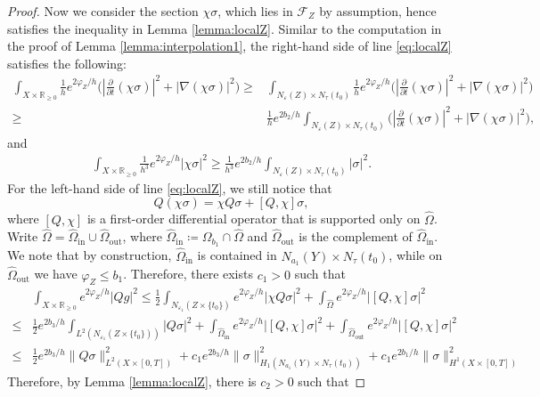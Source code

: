\documentclass[12pt, reqno]{amsart}
\theoremstyle{plain}%
\theoremstyle{definition}
\theoremstyle{remark}
\numberwithin{equation}{section}
\newcommand{\R}{\mathbb{R}}
\begin{document}
\begin{proof}
	Now we consider the section $\chi\sigma$, which lies in $\mathcal F_Z$ by assumption, hence satisfies the inequality in Lemma \ref{lemma:localZ}. Similar to the computation in the proof of Lemma \ref{lemma:interpolation1}, the right-hand side of line \eqref{eq:localZ} satisfies the following:
	\begin{align*}
	\int_{X\times\R_{\geq 0}}\frac 1 he^{2\varphi_Z/h}\Big(|\frac{\partial}{\partial t} (\chi\sigma)|^2+|\nabla (\chi\sigma)|^2\Big)\geq&\int_{N_\varepsilon(Z)\times N_\tau(t_0)}\frac 1 he^{2\varphi_Z/h}\Big(|\frac{\partial}{\partial t} (\chi\sigma)|^2+|\nabla (\chi\sigma)|^2\Big)\\
	\geq &\frac 1 he^{2b_2/h}\int_{N_\varepsilon(Z)\times N_\tau(t_0)}\Big(|\frac{\partial}{\partial t} (\chi\sigma)|^2+|\nabla (\chi\sigma)|^2\Big),
	\end{align*}
	and
	\begin{align*}
		\int_{X\times\R_{\geq 0}}\frac{1}{h^3}e^{2\varphi_Z/h}|\chi\sigma|^2\geq \frac{1}{h^3}e^{2b_2/h}\int_{N_\varepsilon(Z)\times N_\tau(t_0)}|\sigma|^2.
	\end{align*}	
	For the left-hand side of line \eqref{eq:localZ}, we still notice that 
	$$Q(\chi\sigma)=\chi Q\sigma+[Q,\chi]\sigma,$$
	where $[Q,\chi]$ is a first-order differential operator that is supported only on $\widehat\Omega$. Write $\widehat\Omega=\widehat\Omega_{\text{in}}\cup \widehat\Omega_{\text{out}}$, where $\widehat\Omega_{\text{in}}\coloneqq \Omega_{b_1}\cap\widehat\Omega$ and $\widehat\Omega_{\text{out}}$ is the complement of $\widehat\Omega_{\text{in}}$. We note that by construction, $\widehat\Omega_{\text{in}}$ is contained in $N_{a_1}(Y)\times N_\tau(t_0)$, while on  $\widehat\Omega_{\text{out}}$ we have $\varphi_Z\leq b_1$. Therefore, there exists $c_1>0$ such that
	\begin{align*}
		&\int_{X\times\R_{\geq 0}}e^{2\varphi_Z/h}|Qg|^2\leq \frac 1 2\int_{N_{\varepsilon_1}(Z\times\{t_0\})}e^{2\varphi_Z/h}|\chi Q\sigma|^2+\int_{\widehat\Omega}e^{2\varphi_Z/h}|[Q,\chi]\sigma|^2\\
	\leq &\frac1 2e^{2b_3/h}\int_{L^2(N_{\varepsilon_1}(Z\times\{t_0\}))}|Q\sigma|^2+\int_{\widehat\Omega_{\text{in}}}e^{2\varphi_Z/h}|[Q,\chi]\sigma|^2+\int_{\widehat\Omega_{\text{out}}}e^{2\varphi_Z/h}|[Q,\chi]\sigma|^2\\
	\leq &\frac1 2e^{2b_3/h}\|Q\sigma\|^2_{L^2(X\times[0,T])}+c_1e^{2b_3/h}\|\sigma\|^2_{H_1(N_{a_1}(Y)\times N_\tau(t_0))}+c_1e^{2b_1/h}\|\sigma\|^2_{H^1(X\times[0,T])}
	\end{align*}
	Therefore, by Lemma \ref{lemma:localZ}, there is $c_2>0$ such that

\end{proof}
\end{document}
